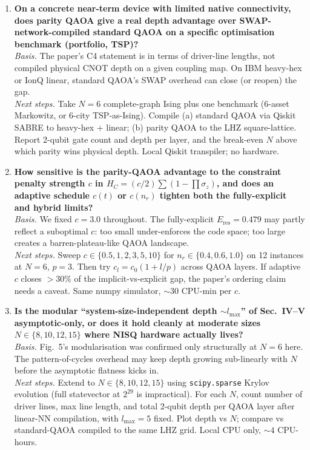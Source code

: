 \begin{enumerate}
\item \textbf{On a concrete near-term device with limited native connectivity,
does parity QAOA give a real depth advantage over SWAP-network-compiled
standard QAOA on a specific optimisation benchmark (portfolio, TSP)?}\\
\textit{Basis.} The paper's C4 statement is in terms of driver-line
lengths, not compiled physical CNOT depth on a given coupling map.
On IBM heavy-hex or IonQ linear, standard QAOA's SWAP overhead can
close (or reopen) the gap.\\
\textit{Next steps.} Take $N=6$ complete-graph Ising plus one benchmark
(6-asset Markowitz, or 6-city TSP-as-Ising). Compile (a) standard QAOA
via Qiskit SABRE to heavy-hex + linear; (b) parity QAOA to the LHZ
square-lattice. Report 2-qubit gate count and depth per layer, and the
break-even $N$ above which parity wins physical depth. Local Qiskit
transpiler; no hardware.

\item \textbf{How sensitive is the parity-QAOA advantage to the
constraint penalty strength $c$ in $H_C=(c/2)\sum(1-\prod\sigma_z)$,
and does an adaptive schedule $c(t)$ or $c(n_r)$ tighten both the
fully-explicit and hybrid limits?}\\
\textit{Basis.} We fixed $c=3.0$ throughout. The fully-explicit
$E_{\mathrm{res}}=0.479$ may partly reflect a suboptimal $c$: too small
under-enforces the code space; too large creates a barren-plateau-like
QAOA landscape.\\
\textit{Next steps.} Sweep $c\in\{0.5,1,2,3,5,10\}$ for $n_r\in\{0.4,0.6,1.0\}$
on 12 instances at $N=6$, $p=3$. Then try $c_l=c_0(1+l/p)$ across QAOA
layers. If adaptive $c$ closes $>30\%$ of the implicit-vs-explicit gap,
the paper's ordering claim needs a caveat. Same numpy simulator,
$\sim 30$ CPU-min per $c$.

\item \textbf{Is the modular ``system-size-independent depth $\sim l_{\max}$''
of Sec.\ IV--V asymptotic-only, or does it hold cleanly at moderate
sizes $N\in\{8,10,12,15\}$ where NISQ hardware actually lives?}\\
\textit{Basis.} Fig.~5's modularisation was confirmed only structurally
at $N=6$ here. The pattern-of-cycles overhead may keep depth growing
sub-linearly with $N$ before the asymptotic flatness kicks in.\\
\textit{Next steps.} Extend to $N\in\{8,10,12,15\}$ using
\texttt{scipy.sparse} Krylov evolution (full statevector at $2^{29}$
is impractical). For each $N$, count number of driver lines, max line
length, and total 2-qubit depth per QAOA layer after linear-NN
compilation, with $l_{\max}=5$ fixed. Plot depth vs $N$; compare vs
standard-QAOA compiled to the same LHZ grid. Local CPU only,
$\sim 4$ CPU-hours.

\end{enumerate}
